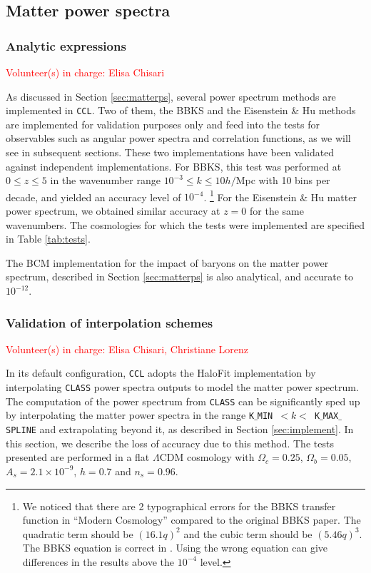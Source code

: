 \documentclass[\docopts]{\docclass}
\newcommand{\vol}[1]{\textcolor{red}{Volunteer(s) in charge: #1}}
\newcommand{\ccl}{{\tt CCL}\xspace}
\begin{document}
\subsection{Matter power spectra}

\subsubsection{Analytic expressions}
\vol{Elisa Chisari}

As discussed in Section \ref{sec:matterps}, several power spectrum methods are implemented in \ccl. Two of them, the BBKS \citep{BBKS} and the Eisenstein \& Hu methods are implemented for validation purposes only and feed into the tests for observables such as angular power spectra and correlation functions, as we will see in subsequent sections. These two implementations have been validated against independent implementations. For BBKS, this test was performed at $0\leq z \leq 5$ in the wavenumber range $10^{-3} \leq k \leq 10 h/$Mpc with 10 bins per decade, and yielded an accuracy level of $10^{-4}$.
\footnote{We noticed that there are 2 typographical errors for the BBKS transfer function in ``Modern Cosmology'' \citep{DodelsonBook} compared to the original BBKS paper. The quadratic term should be $(16.1q)^2$ and the cubic term should be $(5.46q)^3$. The BBKS equation is correct in \citet{PeacockBook}. Using the wrong equation can give differences in the results above the $10^{-4}$ level.}
For the Eisenstein \& Hu matter power spectrum, we obtained similar accuracy at $z=0$ for the same wavenumbers. The cosmologies for which the tests were implemented are specified in Table \ref{tab:tests}.

The BCM implementation for the impact of baryons on the matter power spectrum, described in Section \ref{sec:matterps} is also analytical, and accurate to $10^{-12}$.

\subsubsection{Validation of interpolation schemes}
\vol{Elisa Chisari, Christiane Lorenz}

In its default configuration, \ccl adopts the HaloFit \citep{CLASS_halofit} implementation by interpolating {\tt CLASS} power spectra outputs to model the matter power spectrum. The computation of the power spectrum from {\tt CLASS} can be significantly sped up by interpolating the matter power spectra in the range {\tt K$\_$MIN}~$<k<$~{\tt K$\_$MAX$\_$SPLINE} and extrapolating beyond it, as described in Section \ref{sec:implement}. In this section, we describe the loss of accuracy due to this method. The tests presented are performed in a flat $\Lambda$CDM cosmology with $\Omega_c=0.25$, $\Omega_b=0.05$, $A_s=2.1\times10^{-9}$, $h=0.7$ and $n_s=0.96$.
\end{document}
